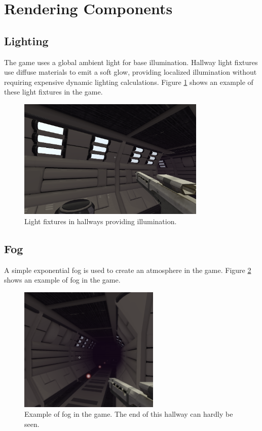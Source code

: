 \documentclass{article}
\begin{document}
\section{Rendering Components}

\subsection{Lighting}
The game uses a global ambient light for base illumination. Hallway light fixtures use diffuse materials to emit a soft glow, providing localized illumination without requiring expensive dynamic lighting calculations. Figure \ref{fig:lights} shows an example of these light fixtures in the game.

\begin{figure}[h]
\centering
\includegraphics[width=0.8\textwidth]{diagrams/lights.png}
\caption{Light fixtures in hallways providing illumination.}
\label{fig:lights}
\end{figure}

\subsection{Fog}
A simple exponential fog is used to create an atmosphere in the game. Figure \ref{fig:fog} shows an example of fog in the game.

\begin{figure}[h]
\centering
\includegraphics[width=0.6\textwidth]{diagrams/fog.png}
\caption{Example of fog in the game. The end of this hallway can hardly be seen.}
\label{fig:fog}
\end{figure}
\end{document}
